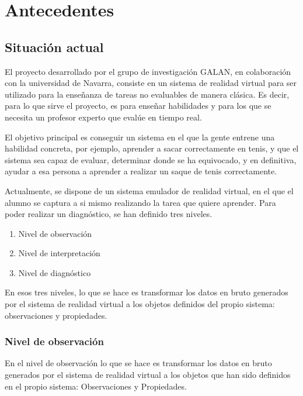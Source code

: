 \chapter{Antecedentes}

\section{Situaci\'on actual}
El proyecto desarrollado por el grupo de investigaci\'on GALAN, en colaboraci\'on con la universidad de Navarra, 
consiste en un sistema de realidad virtual para ser utilizado para la ense\~nanza de tareas no evaluables de manera
cl\'asica. Es decir, para lo que sirve el proyecto, es para ense\~nar habilidades y para los que se necesita un 
profesor experto que eval\'ue en tiempo real.

El objetivo principal es conseguir un sistema en el que la gente entrene una habilidad concreta, por ejemplo, aprender
a sacar correctamente en tenis, y que el sistema sea capaz de evaluar, determinar donde se ha equivocado, y en definitiva,
ayudar a esa persona a aprender a realizar un saque de tenis correctamente.

Actualmente, se dispone de un sistema emulador de realidad virtual, en el que el alumno se captura a si mismo realizando
la tarea que quiere aprender. Para poder realizar un diagn\'ostico, se han definido tres niveles.

\begin{enumerate}
	\item Nivel de observaci\'on
	\item Nivel de interpretaci\'on
	\item Nivel de diagn\'ostico
\end{enumerate}

En esos tres niveles, lo que se hace es transformar los datos en bruto generados por el sistema de realidad virtual
a los objetos definidos del propio sistema: observaciones y propiedades.

\subsection{Nivel de observaci\'on}
En el nivel de observaci\'on lo que se hace es transformar los datos en bruto generados por el sistema de realidad virtual
a los objetos que han sido definidos en el propio sistema: Observaciones y Propiedades.

